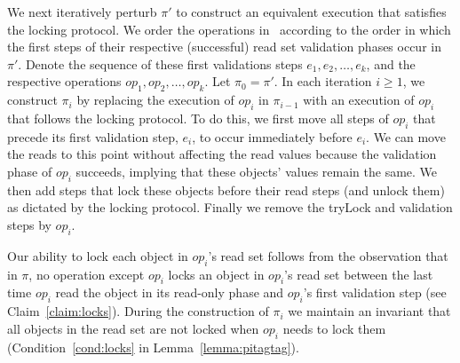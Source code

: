 We next iteratively perturb $\pi'$ to construct an equivalent execution that satisfies the locking protocol.
We order the operations in \op\ according to the order in which the first steps of their 
respective (successful) read set validation phases occur in $\pi'$.
Denote the sequence of these first validations steps $e_1, e_2, \ldots, e_k$, and the respective operations
$op_1, op_2, \ldots, op_k$. Let $\pi_0 = \pi'$. 
In each iteration $i \geq 1$, we construct $\pi_i$ by replacing the execution of $op_i$
in $\pi_{i-1}$ with an execution of $op_i$ that follows the locking protocol. To do this, we first move all steps of $op_i$ that precede 
its first validation step, $e_i$, to occur immediately before $e_i$. We can move the reads to this point without affecting the read
values because the validation phase of $op_i$ succeeds, implying that these objects' values remain the same. 
 We then add steps that lock these objects before their read steps (and unlock
them) as dictated by the locking protocol.
Finally we remove the tryLock and validation steps by $op_i$. 

Our ability to lock each object in $op_i$'s read set follows from the
observation that in $\pi$, no operation except $op_i$ locks an object in
$op_i$'s read set between the last time $op_i$ read the object in its
read-only phase and $op_i$'s first validation step (see Claim~\ref{claim:locks}). 
During the construction of $\pi_i$ we maintain
an invariant that all objects in the read set are not locked when $op_i$ needs
to lock them (Condition~\ref{cond:locks} in Lemma~\ref{lemma:pitagtag}).


